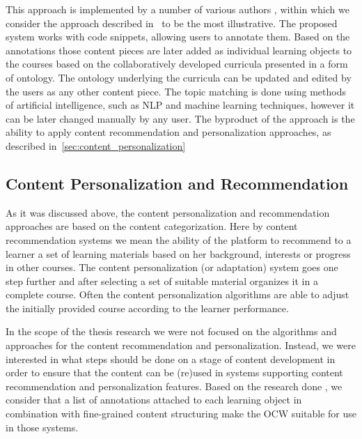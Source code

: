 \documentclass[ngerman,UKenglish,table]{scrbook}
\begin{document}
This approach is implemented by a number of various authors \cite{Zhang2007, Agnew2010, Lee2010, Moro2011, Ghali2009, Achananuparp2007}, within which we consider the approach described in~\cite{Zhang2007} to be the most illustrative.
The proposed system works with code snippets, allowing users to annotate them.
Based on the annotations those content pieces are later added as individual learning objects to the courses based on the collaboratively developed curricula presented in a form of ontology.
The ontology underlying the curricula can be updated and edited by the users as any other content piece. 
The topic matching is done using methods of artificial intelligence, such as NLP and machine learning techniques, however it can be later changed manually by any user.
The byproduct of the approach is the ability to apply content recommendation and personalization approaches, as described in~\autoref{sec:content_personalization}

\subsection{Content Personalization and Recommendation}
\label{sec:content_personalization}

As it was discussed above, the content personalization and recommendation approaches are based on the content categorization.
Here by content recommendation systems we mean the ability of the platform to recommend to a learner a set of learning materials based on her background, interests or progress in other courses.
The content personalization (or adaptation) system goes one step further and after selecting a set of suitable material organizes it in a complete course.
Often the content personalization algorithms are able to adjust the initially provided course according to the learner performance.

In the scope of the thesis research we were not focused on the algorithms and approaches for the content recommendation and personalization.
Instead, we were interested in what steps should be done on a stage of content development in order to ensure that the content can be (re)used in systems supporting content recommendation and personalization features.
Based on the research done \cite{Brooks2006, Ghali2009, Cabada2011}, we consider that a list of annotations attached to each learning object in combination with fine-grained content structuring make the OCW suitable for use in those systems.
\end{document}
